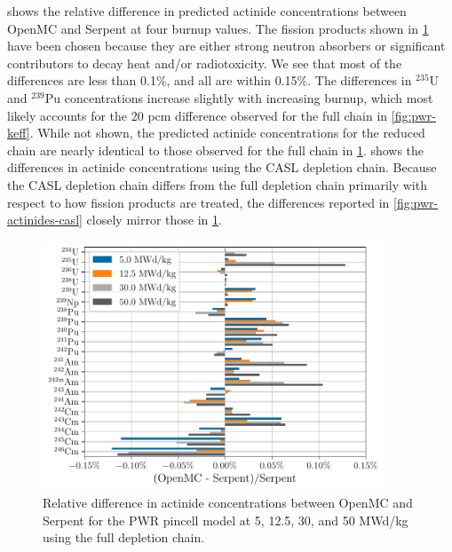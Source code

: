 \documentclass[3p,authoryear]{elsarticle}
\begin{document}
 shows the relative difference in predicted
actinide concentrations between OpenMC and Serpent at four burnup values. The
fission products shown in \cref{fig:pwr-actinides-full} have been chosen because
they are either strong neutron absorbers or significant contributors to decay
heat and/or radiotoxicity. We see that most of the differences are less than
0.1\%, and all are within 0.15\%. The differences in $^{235}$U and $^{239}$Pu
concentrations increase slightly with increasing burnup, which most likely
accounts for the 20 pcm difference observed for the full chain in
\cref{fig:pwr-keff}. While not shown, the predicted actinide concentrations for
the reduced chain are nearly identical to those observed for the full chain in
\cref{fig:pwr-actinides-full}.  shows the
differences in actinide concentrations using the CASL depletion chain. Because
the CASL depletion chain differs from the full depletion chain primarily with
respect to how fission products are treated, the differences reported in
\cref{fig:pwr-actinides-casl} closely mirror those in
\cref{fig:pwr-actinides-full}.
\begin{figure}[H]
  \centering
  \includegraphics[width=4in]{figures/pwr_actinides_full.pdf}
  \caption{Relative difference in actinide concentrations between OpenMC and
  Serpent for the PWR pincell model at 5, 12.5, 30, and 50 MWd/kg using the full
  depletion chain.}
  \label{fig:pwr-actinides-full}
\end{figure}
\end{document}
